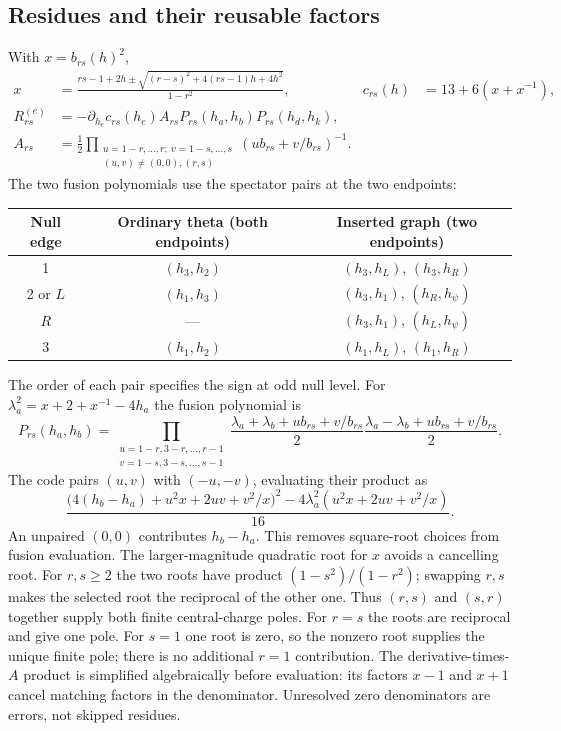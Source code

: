 \documentclass[11pt]{article}
\numberwithin{equation}{section}
\begin{document}
\subsection{Residues and their reusable factors}
With $x=b_{rs}(h)^2$,
\begin{align}
 x&=\frac{rs-1+2h\pm\sqrt{(r-s)^2+4(rs-1)h+4h^2}}{1-r^2},&
 c_{rs}(h)&=13+6(x+x^{-1}),\\
 R_{rs}^{(e)}&=-\partial_{h_e}c_{rs}(h_e)A_{rs}
                       P_{rs}(h_a,h_b)P_{rs}(h_d,h_k),\\
 A_{rs}&=\frac12\prod_{\substack{u=1-r,\ldots,r;\ v=1-s,\ldots,s\\
                  (u,v)\ne(0,0),(r,s)}}(ub_{rs}+v/b_{rs})^{-1}.
 \label{eq:residue}
\end{align}
The two fusion polynomials use the spectator pairs at the two endpoints:
\begin{center}
\begin{tabular}{c cc}
\toprule
Null edge & Ordinary theta (both endpoints) & Inserted graph (two endpoints)\\
\midrule
1 & $(h_3,h_2)$ & $(h_3,h_L)$, $(h_3,h_R)$\\
2 or $L$ & $(h_1,h_3)$ & $(h_3,h_1)$, $(h_R,h_\psi)$\\
$R$ & --- & $(h_3,h_1)$, $(h_L,h_\psi)$\\
3 & $(h_1,h_2)$ & $(h_1,h_L)$, $(h_1,h_R)$\\
\bottomrule
\end{tabular}
\end{center}
The order of each pair specifies the sign at odd null level.
For $\lambda_a^2=x+2+x^{-1}-4h_a$ the fusion polynomial is
\begin{equation}
 P_{rs}(h_a,h_b)=
 \prod_{\substack{u=1-r,3-r,\ldots,r-1\\v=1-s,3-s,\ldots,s-1}}
 \frac{\lambda_a+\lambda_b+ub_{rs}+v/b_{rs}}2
 \frac{\lambda_a-\lambda_b+ub_{rs}+v/b_{rs}}2.
\end{equation}
The code pairs $(u,v)$ with $(-u,-v)$, evaluating their product as
\begin{equation}
 \frac{\bigl(4(h_b-h_a)+u^2x+2uv+v^2/x\bigr)^2
       -4\lambda_a^2(u^2x+2uv+v^2/x)}{16}.
\end{equation}
An unpaired $(0,0)$ contributes $h_b-h_a$. This removes square-root choices
from fusion evaluation. The larger-magnitude quadratic root for $x$ avoids
a cancelling root. For $r,s\ge2$ the two roots have product
$(1-s^2)/(1-r^2)$; swapping $r,s$ makes the selected root the reciprocal
of the other one. Thus $(r,s)$ and $(s,r)$ together supply both finite
central-charge poles. For $r=s$ the roots are reciprocal and give one pole.
For $s=1$ one root is zero, so the nonzero root supplies the unique finite
pole; there is no additional $r=1$ contribution.
The derivative-times-$A$ product is simplified algebraically before evaluation:
its factors $x-1$ and $x+1$ cancel matching factors in the denominator.
Unresolved zero denominators are errors, not skipped residues.
\end{document}
